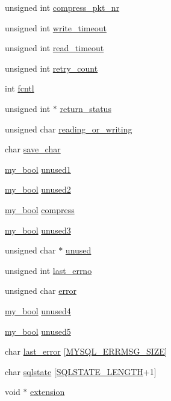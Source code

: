 \begin{DoxyCompactItemize}
unsigned int \hyperlink{structst__net_aee8117a193c6eaf0166b6d140fdc7c8e}{compress\+\_\+pkt\+\_\+nr}
\item 
unsigned int \hyperlink{structst__net_a178724b62ac9b041f5e21b1b9897b694}{write\+\_\+timeout}
\item 
unsigned int \hyperlink{structst__net_a498927f121414f913f35585dbfa2d4b3}{read\+\_\+timeout}
\item 
unsigned int \hyperlink{structst__net_a0365f5779e0d4a8052dbd26a04196b5b}{retry\+\_\+count}
\item 
int \hyperlink{structst__net_af0e9b81f66c42f6bb55d53608a24d894}{fcntl}
\item 
unsigned int $\ast$ \hyperlink{structst__net_a3ce1808fa2c992e291de3012c29c6857}{return\+\_\+status}
\item 
unsigned char \hyperlink{structst__net_af097f7a98db2436221b2633daf1e6cba}{reading\+\_\+or\+\_\+writing}
\item 
char \hyperlink{structst__net_abf68d4ab7d94a60f5b367e137db8b897}{save\+\_\+char}
\item 
\hyperlink{mysql_8h_a74cd599039dcf29c6e6d342cf4efd0a8}{my\+\_\+bool} \hyperlink{structst__net_a14213eeeee153b43edc68698b46d5220}{unused1}
\item 
\hyperlink{mysql_8h_a74cd599039dcf29c6e6d342cf4efd0a8}{my\+\_\+bool} \hyperlink{structst__net_a814bce0c37d5ad61c5d8dac055884902}{unused2}
\item 
\hyperlink{mysql_8h_a74cd599039dcf29c6e6d342cf4efd0a8}{my\+\_\+bool} \hyperlink{structst__net_ae72db65cba31233b606eacd0a0da5769}{compress}
\item 
\hyperlink{mysql_8h_a74cd599039dcf29c6e6d342cf4efd0a8}{my\+\_\+bool} \hyperlink{structst__net_aafa39985fb118923f443ece4e9bc1820}{unused3}
\item 
unsigned char $\ast$ \hyperlink{structst__net_af405b9e71e576024dde5601684393417}{unused}
\item 
unsigned int \hyperlink{structst__net_ad32d83e52fbb9bde714a4e91ddd4cca7}{last\+\_\+errno}
\item 
unsigned char \hyperlink{structst__net_af25692866530d247001f5c189ffca8f6}{error}
\item 
\hyperlink{mysql_8h_a74cd599039dcf29c6e6d342cf4efd0a8}{my\+\_\+bool} \hyperlink{structst__net_a23a02e676dfbde5b3a42a40d297fdc9e}{unused4}
\item 
\hyperlink{mysql_8h_a74cd599039dcf29c6e6d342cf4efd0a8}{my\+\_\+bool} \hyperlink{structst__net_a1b104bdc3379ed54125acd4c3fc017a7}{unused5}
\item 
char \hyperlink{structst__net_a076ac7884d3874905c0c95b6518228fc}{last\+\_\+error} \mbox{[}\hyperlink{mysql__com_8h_a3f5f3eab30894e1dfa8d5bd977a889be}{M\+Y\+S\+Q\+L\+\_\+\+E\+R\+R\+M\+S\+G\+\_\+\+S\+I\+Z\+E}\mbox{]}
\item 
char \hyperlink{structst__net_a0f689854fdd40edbf79cc7e248ecd02f}{sqlstate} \mbox{[}\hyperlink{mysql__com_8h_a8e152edf1a0bae8aec7f5d59cebfbea9}{S\+Q\+L\+S\+T\+A\+T\+E\+\_\+\+L\+E\+N\+G\+T\+H}+1\mbox{]}
\item 
void $\ast$ \hyperlink{structst__net_a7b50c3d075f87f4e51a1726a7d714869}{extension}
\end{DoxyCompactItemize}


